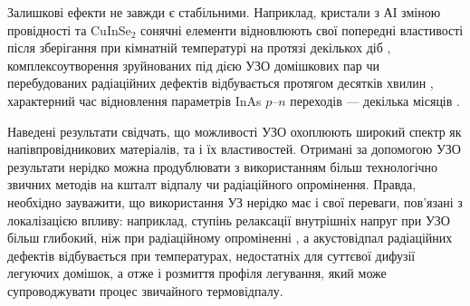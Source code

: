 %
%
%
%
%
%
%
%
%


Залишкові ефекти не завжди є стабільними.
Наприклад, кристали з АІ зміною провідності та  CuInSe$_2$ сонячні елементи відновлюють свої попередні властивості після зберігання при кімнатній температурі на протязі декількох діб \cite{YOlikh2006TPLr,US:ZnCdTe,BorkovFTT,OstapSC},
комплексоутворення зруйнованих під дією УЗО домішкових пар чи перебудованих радіаційних дефектів відбувається протягом десятків хвилин \cite{Ostapenko1995SST,Ostapenko1995,YOlikh2006TPLr},
характерний час відновлення параметрів InAs $p$--$n$ переходів --- декілька місяців \cite{Teterkin2009r}.



Наведені результати свідчать, що можливості УЗО охоплюють широкий спектр як напівпровідникових матеріалів, та і їх властивостей.
Отримані за допомогою УЗО результати нерідко можна продублювати з використанням більш технологічно звичних методів на кшталт відпалу чи радіаційного опромінення.
Правда, необхідно зауважити, що використання УЗ нерідко має і свої переваги, пов'язані з локалізацією впливу:
наприклад, ступінь релаксації внутрішніх напруг при УЗО більш глибокий, ніж при радіаційному опроміненні \cite{UST:GeGaAs1990},
а акустовідпал радіаційних дефектів \cite{PodolHivr,UST:OstrovCsI,YOlikh2007TPLr} відбувається при температурах, недостатніх для суттєвої дифузії легуючих домішок, а отже і розмиття профіля легування, який може супроводжувати процес звичайного термовідпалу.

